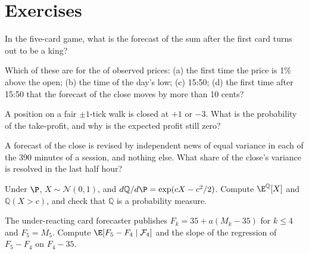 \section{Exercises}

\begin{exercise}[$\star$]\label{exo:qm:probability-at-speed:1}
In the five-card game, what is the forecast of the sum after the first card turns out to be
a king?
\end{exercise}

\begin{exercise}[$\star$]\label{exo:qm:probability-at-speed:2}
Which of these are  for the  of observed prices: (a) the first time
the price is 1\% above the open; (b) the time of the day's low; (c) 15:50; (d) the first
time after 15:50 that the forecast of the close moves by more than 10 cents?
\end{exercise}

\begin{exercise}[$\star$]\label{exo:qm:probability-at-speed:3}
A position on a fair $\pm1$-tick walk is closed at $+1$ or $-3$. What is the probability of
the take-profit, and why is the expected profit still zero?
\end{exercise}

\begin{exercise}[$\star\star$]\label{exo:qm:probability-at-speed:4}
A forecast of the close is revised by independent news of equal variance in each of the 390
minutes of a session, and nothing else. What share of the close's variance is resolved in
the last half hour?
\end{exercise}

\begin{exercise}[$\star\star$]\label{exo:qm:probability-at-speed:5}
Under $\P$, $X \sim \mathcal N(0,1)$, and $d\mathbb Q/d\P = \exp(cX - c^2/2)$. Compute $\E^{\mathbb
Q}[X]$ and $\mathbb Q(X > c)$, and check that $\mathbb Q$ is a probability measure.
\end{exercise}

\begin{exercise}[$\star\star$]\label{exo:qm:probability-at-speed:6}
The under-reacting card forecaster publishes $F_k = 35 + a(M_k - 35)$ for $k \le 4$ and $F_5 =
M_5$. Compute $\E[F_5 - F_4 \mid \mathcal F_4]$ and the slope of the regression of $F_5 - F_4$ on
$F_4 - 35$.
\end{exercise}

